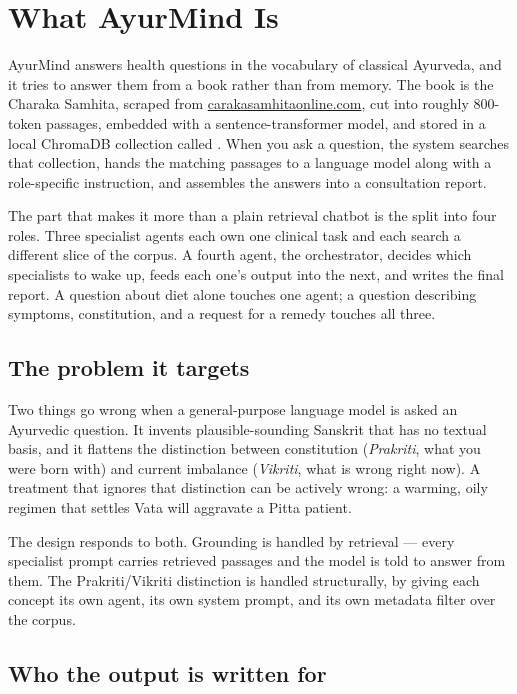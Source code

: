 \chapter{What AyurMind Is}

AyurMind answers health questions in the vocabulary of classical Ayurveda, and it tries to answer them from a book rather than from memory. The book is the Charaka Samhita, scraped from \href{https://www.carakasamhitaonline.com}{carakasamhitaonline.com}, cut into roughly 800-token passages, embedded with a sentence-transformer model, and stored in a local ChromaDB collection called . When you ask a question, the system searches that collection, hands the matching passages to a language model along with a role-specific instruction, and assembles the answers into a consultation report.

The part that makes it more than a plain retrieval chatbot is the split into four roles. Three specialist agents each own one clinical task and each search a different slice of the corpus. A fourth agent, the orchestrator, decides which specialists to wake up, feeds each one's output into the next, and writes the final report. A question about diet alone touches one agent; a question describing symptoms, constitution, and a request for a remedy touches all three.

\section{The problem it targets}

Two things go wrong when a general-purpose language model is asked an Ayurvedic question. It invents plausible-sounding Sanskrit that has no textual basis, and it flattens the distinction between constitution (\emph{Prakriti}, what you were born with) and current imbalance (\emph{Vikriti}, what is wrong right now). A treatment that ignores that distinction can be actively wrong: a warming, oily regimen that settles Vata will aggravate a Pitta patient.

The design responds to both. Grounding is handled by retrieval --- every specialist prompt carries retrieved passages and the model is told to answer from them. The Prakriti/Vikriti distinction is handled structurally, by giving each concept its own agent, its own system prompt, and its own metadata filter over the corpus.

\section{Who the output is written for}


